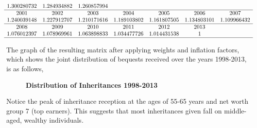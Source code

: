 \documentclass[letterpaper,12pt]{article}
\theoremstyle{definition}
\begin{document}
\begin{spacing}{1.5}
\[\begin{matrix}
   1.300280732 & 1.284934882 & 1.260857994  \\
  \hline
   2001&2002&  2003&  2004&  2005&  2006 &2007\\

    1.240039148 & 1.227912707 & 1.210171616 & 1.189103802 & 1.161807505 & 1.134803101& 1.109966432  \\
    \hline

      2008&  2009&  2010&  2011&  2012&  2013\\

    1.076012397 & 1.078969961 & 1.063898833 & 1.034477726 & 1.014431538 & 1\\
  \hline

  \end{matrix}\]

  The graph of the resulting matrix after applying weights and inflation factors, which shows the joint distribution of bequests received over the years 1998-2013, is as follows,\\
  \begin{figure}[htbp]\centering \captionsetup{width=4.0in}
    \caption{\label{proportions}\textbf{Distribution of Inheritances 1998-2013}}
  \end{figure}

  

  \newpage Notice the peak of inheritance reception at the ages of 55-65 years and net worth group 7 (top earners). This suggests that most inheritances given fall on middle-aged, wealthy individuals.




\end{spacing}
\end{document}
